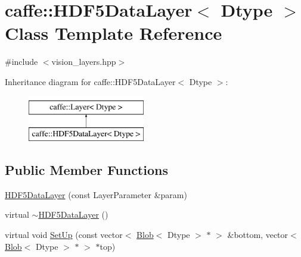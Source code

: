 \hypertarget{classcaffe_1_1_h_d_f5_data_layer}{\section{caffe\+:\+:H\+D\+F5\+Data\+Layer$<$ Dtype $>$ Class Template Reference}
\label{classcaffe_1_1_h_d_f5_data_layer}
}


{\ttfamily \#include $<$vision\+\_\+layers.\+hpp$>$}

Inheritance diagram for caffe\+:\+:H\+D\+F5\+Data\+Layer$<$ Dtype $>$\+:\begin{figure}[H]
\begin{center}
\leavevmode
\includegraphics[height=2.000000cm]{classcaffe_1_1_h_d_f5_data_layer}
\end{center}
\end{figure}
\subsection*{Public Member Functions}
\begin{DoxyCompactItemize}
\item 
\hyperlink{classcaffe_1_1_h_d_f5_data_layer_abfc7dcc4f07c228eb0deb1e0dfae1a5f}{H\+D\+F5\+Data\+Layer} (const Layer\+Parameter \&param)
\item 
virtual \hyperlink{classcaffe_1_1_h_d_f5_data_layer_abadf2581e305508da149d1d799a3ec0a}{$\sim$\+H\+D\+F5\+Data\+Layer} ()
\item 
virtual void \hyperlink{classcaffe_1_1_h_d_f5_data_layer_a1b1786da3b00f367508d5f89d8d7dd59}{Set\+Up} (const vector$<$ \hyperlink{classcaffe_1_1_blob}{Blob}$<$ Dtype $>$ $\ast$ $>$ \&bottom, vector$<$ \hyperlink{classcaffe_1_1_blob}{Blob}$<$ Dtype $>$ $\ast$ $>$ $\ast$top)
\end{DoxyCompactItemize}
